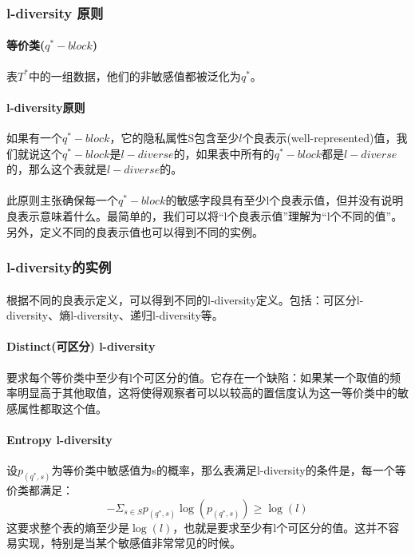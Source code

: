\documentclass[12pt,a4paper]{article}
\begin{document}
\subsubsection{l-diversity 原则}
\paragraph{等价类($q^*-block$)} 表$T^*$中的一组数据，他们的非敏感值都被泛化为$q^*$。
\paragraph{l-diversity原则} 如果有一个$q^*-block$，它的隐私属性S包含至少$l$个良表示(well-represented)值，我们就说这个$q^*-block$是$l-diverse$的，如果表中所有的$q^*-block$都是$l-diverse$的，那么这个表就是$l-diverse$的。
\paragraph{} 此原则主张确保每一个$q^*-block$的敏感字段具有至少l个良表示值，但并没有说明良表示意味着什么。最简单的，我们可以将“l个良表示值”理解为“l个不同的值”。另外，定义不同的良表示值也可以得到不同的实例。
\subsubsection{l-diversity的实例}
\paragraph{} 根据不同的良表示定义，可以得到不同的l-diversity定义。包括：可区分l-diversity、熵l-diversity、递归l-diversity等。

\paragraph{Distinct(可区分) l-diversity} 要求每个等价类中至少有l个可区分的值。它存在一个缺陷：如果某一个取值的频率明显高于其他取值，这将使得观察者可以以较高的置信度认为这一等价类中的敏感属性都取这个值。

\paragraph{Entropy l-diversity} 设$p_(q^*,s)$为等价类中敏感值为s的概率，那么表满足l-diversity的条件是，每一个等价类都满足：
\begin{equation}
	- \Sigma_{s \in S} p_(q^*,s) \log(p_(q^*,s)) \geq \log(l)
\end{equation}
这要求整个表的熵至少是$\log(l)$，也就是要求至少有l个可区分的值。这并不容易实现，特别是当某个敏感值非常常见的时候。
\end{document}
